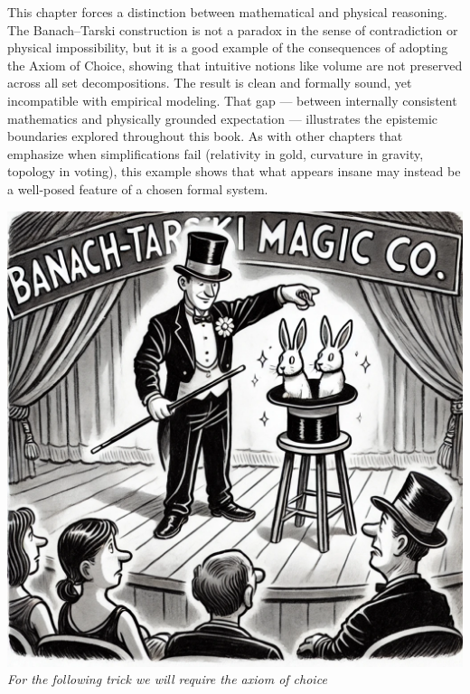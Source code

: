 \begin{commentary}[Commentary]
This chapter forces a distinction between mathematical and physical reasoning. The Banach–Tarski construction is not a paradox in the sense of contradiction or physical impossibility, but it is a good example of the consequences of adopting the Axiom of Choice, showing that intuitive notions like volume are not preserved across all set decompositions. The result is clean and formally sound, yet incompatible with empirical modeling. That gap — between internally consistent mathematics and physically grounded expectation — illustrates the epistemic boundaries explored throughout this book. As with other chapters that emphasize when simplifications fail (relativity in gold, curvature in gravity, topology in voting), this example shows that what appears insane may instead be a well-posed feature of a chosen formal system.

\end{commentary}
\vspace{2em}
\begin{center}
    \includegraphics[height=10\baselineskip]{01_BanachTarskiParadox/BANACH.png}\\
    {\small\textit{For the following trick we will require the axiom of choice}}
\end{center}